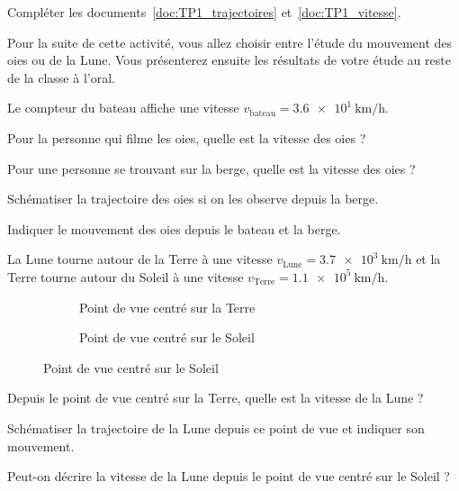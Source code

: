 
\numeroQuestion
Compléter les documents~\ref{doc:TP1_trajectoires} et~\ref{doc:TP1_vitesse}.

\fleche Pour la suite de cette activité, vous allez choisir entre l'étude du mouvement des oies ou de la Lune.
Vous présenterez ensuite les résultats de votre étude au reste de la classe à l'oral.


\newpage
{}

Le compteur du bateau affiche une vitesse $v_\text{bateau} = \qty{3,6e1}{\km/\hour}$.

\vspace*{6pt}
\numeroQuestion Pour la personne qui filme les oies, quelle est la vitesse des oies ?

\numeroQuestion Pour une personne se trouvant sur la berge, quelle est la vitesse des oies ?

\numeroQuestion Schématiser la trajectoire des oies si on les observe depuis la berge.

\numeroQuestion Indiquer le mouvement des oies depuis le bateau et la berge.


La Lune tourne autour de la Terre à une vitesse $v_\text{Lune} = \qty{3,7e3}{\km/\hour}$
et la Terre tourne autour du Soleil à une vitesse $v_\text{Terre} = \qty{1,1e5}{\km/\hour}$.

\begin{figure}[!ht]
  \begin{subfigure}{0.48\linewidth}
    \centering
    \caption{Point de vue centré sur la Terre}
    \label{fig:terre_lune}
  \end{subfigure}
  \begin{subfigure}{0.48\linewidth}
    \centering
    \caption{Point de vue centré sur le Soleil}
    \label{fig:terre_lune_soleil}
  \end{subfigure}
\end{figure}

\vspace*{-6pt}
\numeroQuestion Depuis le point de vue centré sur la Terre, quelle est la vitesse de la Lune ?

\numeroQuestion Schématiser la trajectoire de la Lune depuis ce point de vue et indiquer son mouvement.

\numeroQuestion Peut-on décrire la vitesse de la Lune depuis le point de vue centré sur le Soleil ?

